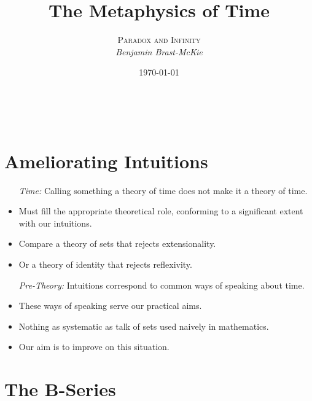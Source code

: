 \documentclass[a4paper, 11pt]{article} %
\title{\textbf{The Metaphysics of Time}} %
\author{\textsc{Paradox and Infinity}\\ \em Benjamin Brast-McKie} %
\date{\today} %
\makeatletter
\renewcommand{\maketitle}{ %
\begin{flushright} %
{\LARGE\@title} %

\vspace{10pt} %

{\@author} %
\\\@date %

\vspace{-20pt} %
\end{flushright}
}
\makeatother
\begin{document}
\maketitle %

\thispagestyle{empty}



\section*{Ameliorating Intuitions}

\begin{itemize}
  \item[\it Time:] Calling something a theory of time does not make it a theory of time.
    \item Must fill the appropriate theoretical role, conforming to a significant extent with our intuitions.
    \item Compare a theory of sets that rejects extensionality.
    \item Or a theory of identity that rejects reflexivity.
  \item[\it Pre-Theory:] Intuitions correspond to common ways of speaking about time.
    \item These ways of speaking serve our practical aims.
    \item Nothing as systematic as talk of sets used naively in mathematics.
    \item Our aim is to improve on this situation.
\end{itemize}




\section*{The B-Series}
\end{document}
